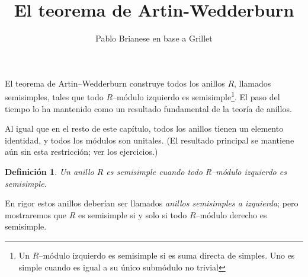 \documentclass{article}
\title{El teorema de Artin-Wedderburn}
\author{Pablo Brianese en base a Grillet}
\newtheorem{definition}{Definición}[section]
\begin{document}
\maketitle


El teorema de Artin--Wedderburn construye todos los anillos $R$, llamados semisimples, tales que todo $R$--módulo izquierdo es semisimple\footnote{Un $R$--módulo izquierdo es semisimple si es suma directa de simples. Uno es simple cuando es igual a su único submódulo no trivial}. El paso del tiempo lo ha mantenido como un resultado fundamental de la teoría de anillos.

Al igual que en el resto de este capítulo, todos los anillos tienen un elemento identidad, y todos los módulos son unitales. (El resultado principal se mantiene aún sin esta restricción; ver los ejercicios.)

\begin{definition}
    Un anillo $R$ es \emph{semisimple} cuando todo R--módulo izquierdo es semisimple.
\end{definition}

En rigor estos anillos deberían ser llamados \emph{anillos semisimples a izquierda}; pero mostraremos que $R$ es semisimple si y solo si todo $R$--módulo derecho es semisimple.
\end{document}
